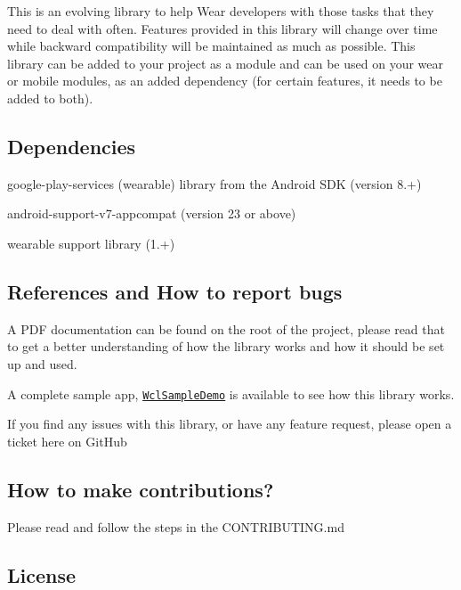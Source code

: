 This is an evolving library to help Wear developers with those tasks that they need to deal with often. Features provided in this library will change over time while backward compatibility will be maintained as much as possible. This library can be added to your project as a module and can be used on your wear or mobile modules, as an added dependency (for certain features, it needs to be added to both).

\subsection*{Dependencies}


\begin{DoxyItemize}
\item google-\/play-\/services (wearable) library from the Android S\+DK (version 8.+)
\item android-\/support-\/v7-\/appcompat (version 23 or above)
\item wearable support library (1.+)
\end{DoxyItemize}

\subsection*{References and How to report bugs}


\begin{DoxyItemize}
\item A P\+DF documentation can be found on the root of the project, please read that to get a better understanding of how the library works and how it should be set up and used.
\item A complete sample app, \href{https://github.com/googlesamples/android-WclDemoSample}{\tt Wcl\+Sample\+Demo} is available to see how this library works.
\item If you find any issues with this library, or have any feature request, please open a ticket here on Git\+Hub
\end{DoxyItemize}

\subsection*{How to make contributions?}

Please read and follow the steps in the C\+O\+N\+T\+R\+I\+B\+U\+T\+I\+N\+G.\+md

\subsection*{License}

